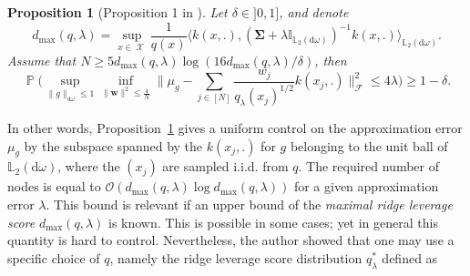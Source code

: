 \documentclass[twoside,11pt]{book}
\newtheorem{proposition}{Proposition}
\DeclareMathOperator{\Prb}{\mathbb{P}}
\DeclareMathOperator{\X}{\mathcal{X}}
\begin{document}
\begin{proposition}[Proposition 1 in \cite{Bac17}]
\label{p:bach_general_proposal}
Let $\delta \in ]0,1]$, and denote
\begin{equation}
d_{\max}(q,\lambda) = \sup\limits_{x \in \X} \frac{1}{q(x)} \langle k(x,.), (\bm{\Sigma}+\lambda \mathbb{I}_{\mathbb{L}_{2}(\mathrm{d}\omega)})^{-1}k(x,.) \rangle_{\mathbb{L}_{2}(\mathrm{d}\omega)}.
\end{equation}
Assume that $N \geq 5 d_{\max}(q,\lambda) \log(16 d_{\max}(q,\lambda) / \delta)$, then
\begin{equation}
\Prb \bigg( \sup\limits_{\|g\|_{\mathrm{d}\omega} \leq 1} \inf\limits_{\|\bm{w}\|^{2}\leq \frac{4}{N}} \Big\| \mu_{g} - \sum\limits_{j \in [N]} \frac{w_{j}}{q_\lambda(x_{j})^{1/2}} k(x_{j},.)\Big\|_{\mathcal{F}}^{2} \leq 4\lambda \bigg) \geq 1- \delta .
\end{equation}
\end{proposition}



In other words, Proposition~\ref{p:bach_general_proposal} gives a uniform  control on the approximation error $\mu_{g}$ by the subspace spanned by the $k(x_{j},.)$ for $g$ belonging to the unit ball of $\mathbb{L}_{2}(\mathrm{d}\omega)$, where the $(x_{j})$ are sampled i.i.d. from $q$. The required number of nodes is equal to $\mathcal{O}(d_{\max}(q,\lambda)\log d_{\max}(q,\lambda))$ for a given approximation error $\lambda$. This bound is relevant if an upper bound of the \emph{maximal ridge leverage score} $d_{\max}(q,\lambda)$ is known. This is possible in some cases; yet in general this quantity is hard to control. Nevertheless, the author showed that one may use a specific choice of $q$, namely the ridge leverage score distribution $q_{\lambda}^{*}$ defined as
\end{document}
